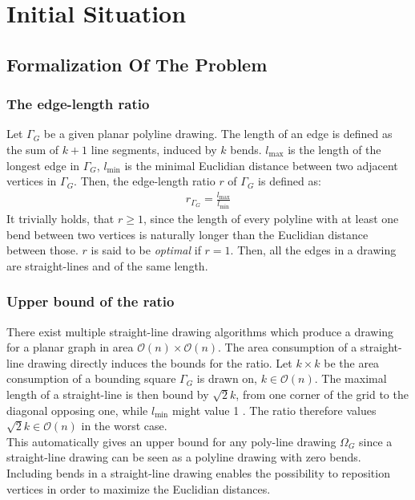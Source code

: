\section{Initial Situation}\label{section:initial_situation}

\subsection{Formalization Of The Problem}
\subsubsection{The edge-length ratio}
Let $\Gamma_G$ be a given planar polyline drawing. The length of an edge is defined as the sum of $k+1$ line segments, induced by $k$ bends. $l_{\max}$ is the length of the longest edge in $\Gamma_G$, $l_{\min}$ is the minimal Euclidian distance between two adjacent vertices in $\Gamma_G$. Then, the edge-length ratio $r$ of $\Gamma_G$ is defined as:
\begin{align}
	r_{\Gamma_G} = \frac{l_{\max}}{l_{\min}} 
\end{align}
It trivially holds, that $r\geq1$, since the length of every polyline with at least one bend between two vertices is naturally longer than the Euclidian distance between those. $r$ is said to be \emph{optimal }if $r=1$. Then, all the edges in a drawing are straight-lines and of the same length.
\subsubsection{Upper bound of the ratio}
There exist multiple straight-line drawing algorithms which produce a drawing for a planar graph in area $\mathcal{O}(n)\times\mathcal{O}(n)$.
The area consumption of a straight-line drawing directly induces the bounds for the ratio. Let $k\times k$ be the area consumption of a bounding square $\Gamma_G$ is drawn on, $k\in \mathcal{O}(n)$. The maximal length of a straight-line is then bound by $\sqrt{2}k$, from one corner of the grid to the diagonal opposing one, while $l_{\min}$ might value 1 \UL. The ratio therefore values $\sqrt{2}k \in \mathcal{O}(n)$ in the worst case.\\
This automatically gives an upper bound for any poly-line drawing $\Omega_G$ since a straight-line drawing can be seen as a polyline drawing with zero bends. Including bends in a straight-line drawing enables the possibility to reposition vertices in order to maximize the Euclidian distances.

